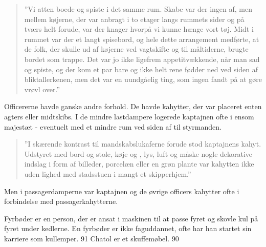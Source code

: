 \begin{quote}
    
    ''Vi atten  boede og spiste i det samme rum. Skabe var der
    ingen af, men mellem køjerne, der var anbragt i to etager langs
    rummets sider og på tværs helt forude, var der knager hvorpå vi kunne
    hænge vort tøj. Midt i rummet var der et langt spisebord, og hele
    dette arrangement medførte, at de folk, der skulle ud af køjerne ved
    vagtskifte og til måltiderne, brugte bordet som trappe. Det var jo
    ikke ligefrem appetitvækkende, når man sad og spiste, og der kom et
    par bare og ikke helt rene fødder ned ved siden af bliktallerkenen,
    men det var en uundgåelig ting, som ingen fandt på at gøre vrøvl
    over.''

\end{quote}


Officererne havde ganske andre forhold.
De havde kahytter, der var placeret enten agters eller midtskibs. I de
mindre lastdampere logerede kaptajnen ofte i ensom majestæt - eventuelt
med et mindre rum ved siden af til styrmanden. 

\begin{quote}
    
    ''I skærende kontrast til mandskabslukaferne forude stod kaptajnens
    kahyt. Udstyret med bord og stole, køje og , lys, luft og
    måske nogle dekorative indslag i form af billeder, porcelæn eller en
    grøn plante var kahytten ikke uden lighed med stadsstuen i mangt et
    skipperhjem.''

\end{quote}


Men i passagerdamperne var kaptajnen og de øvrige officers kahytter ofte
i forbindelse med passagerkahytterne.

 Fyrbøder er en
person, der er ansat i maskinen til at passe fyret og skovle kul på
fyret under kedlerne. En fyrbøder er ikke faguddannet, ofte har han
startet sin karriere som kullemper. 91 Chatol er et skuffemøbel. 90
